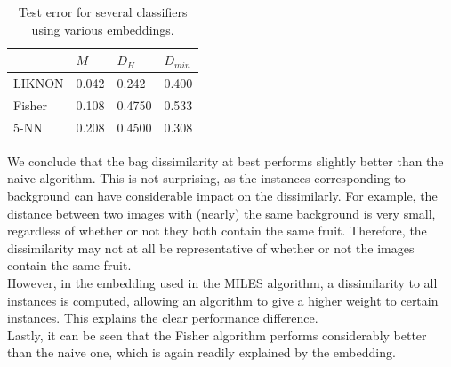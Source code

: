 \documentclass [a4paper] {report}
\begin{document}
	\begin{table}[H]
		\centering
		\caption{Test error for several classifiers using various embeddings.}
		\label{scores}
		\begin{tabular}{l|lll}
				   & $M$   & $D_{H}$                    & $D_{min}$                  \\ \hline
			LIKNON & 0.042 & 0.242                      & 0.400                     \\
			Fisher & 0.108 & 0.4750                     & 0.533                     \\ 
			5-NN   & 0.208 & 0.4500 					& 0.308 \\
		\end{tabular}
	\end{table}
	
	\noindent
	We conclude that the bag dissimilarity at best performs slightly better than the naive algorithm. This is not surprising, as the instances corresponding to background can have considerable impact on the dissimilarly. For example, the distance between two images with (nearly) the same background is very small, regardless of whether or not they both contain the same fruit. Therefore, the dissimilarity may not at all be representative of whether or not the images contain the same fruit. \\
	However, in the embedding used in the MILES algorithm, a dissimilarity to all instances is computed, allowing an algorithm to give a higher weight to certain instances. This explains the clear performance difference.\\
	Lastly, it can be seen that the Fisher algorithm performs considerably better than the naive one, which is again readily explained by the embedding. 
	
	\newpage
\end{document}
